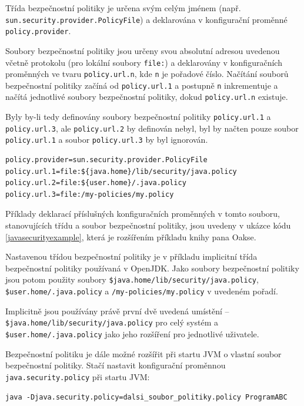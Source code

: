 Třída bezpečnostní politiky je určena svým celým jménem (např. {\tt sun.security.provider.PolicyFile}) a deklarována v konfigurační proměnné {\tt policy.provider}. \cite{refPolicyFiles}

Soubory bezpečnostní politiky jsou určeny svou absolutní adresou uvedenou včetně protokolu (pro lokální soubory {\tt file:}) a deklarovány v konfiguračních proměnných ve tvaru {\tt policy.url.n}, kde {\tt n} je pořadové číslo. Načítání souborů bezpečnostní politiky začíná od {\tt policy.url.1} a postupně {\tt n} inkrementuje a načítá jednotlivé soubory bezpečnostní politiky, dokud {\tt policy.url.n} existuje. \cite{refPolicyFiles}

Byly by-li tedy definovány soubory bezpečnostní politiky {\tt policy.url.1} a {\tt policy.url.3}, ale {\tt policy.url.2} by definován nebyl, byl by načten pouze soubor {\tt policy.url.1} a soubor {\tt policy.url.3} by byl ignorován. \cite{refPolicyFiles}

\begin{lstlisting}[caption=Význačnější proměnné konfiguračního souboru {\tt java.security}, label=javasecurityexample]
policy.provider=sun.security.provider.PolicyFile
policy.url.1=file:${java.home}/lib/security/java.policy
policy.url.2=file:${user.home}/.java.policy
policy.url.3=file:/my-policies/my.policy
\end{lstlisting}

Příklady deklarací příslušných konfiguračních proměnných v tomto souboru, stanovujících třídu a soubor bezpečnostní politiky, jsou uvedeny v ukázce kódu \ref{javasecurityexample}, která je rozšířením příkladu knihy pana Oakse. \cite[5.3.1]{oaks}

Nastavenou třídou bezpečnostní politiky je v příkladu implicitní třída bezpečnostní politiky používaná v OpenJDK. Jako soubory bezpečnostní politiky jsou potom použity soubory {\tt \${java.home}/lib/security/java.policy}, {\tt \${user.home}/.java.policy} a {\tt /my-policies/my.policy} v uvedeném pořadí.

Implicitně jsou používány právě první dvě uvedená umístění -- {\tt \${java.home}/lib/security/java.policy} pro celý systém a {\tt \${user.home}/.java.policy} jako jeho rozšíření pro jednotlivé uživatele. \cite{refSecurity}

Bezpečnostní politiku je dále možné rozšířit při startu JVM o vlastní soubor bezpečnostní politiky. Stačí nastavit konfigurační proměnnou {\tt java.security.policy} při startu JVM: \cite[5.3.1]{oaks}

\begin{verbatim}
java -Djava.security.policy=dalsi_soubor_politiky.policy ProgramABC
\end{verbatim}

